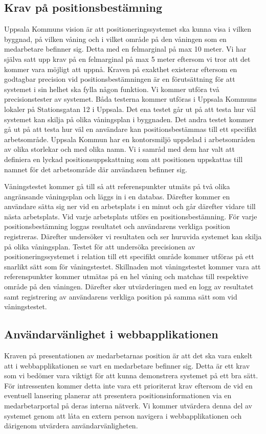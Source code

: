 \documentclass[a4paper,12pt]{article}
\begin{document}
 \subsection{Krav på positionsbestämning} \label{positionstest}
 Uppsala Kommuns vision är att positioneringssystemet ska kunna visa i vilken byggnad, på vilken våning och i vilket område på den våningen som en medarbetare befinner sig. Detta med en felmarginal på max 10 meter. Vi har själva satt upp krav på en felmarginal på max 5 meter eftersom vi tror att det kommer vara möjligt att uppnå. Kraven på exakthet existerar eftersom en godtagbar precision vid positionsbestämningen är en förutsättning för att systemet i sin helhet ska fylla någon funktion. Vi kommer utföra två precisionstester av systemet. Båda testerna kommer utföras i Uppsala Kommuns lokaler på Stationsgatan 12 i Uppsala. Det ena testet går ut på att testa hur väl systemet kan skilja på olika våningsplan i byggnaden. Det andra testet kommer gå ut på att testa hur väl en användare kan positionsbestämmas till ett specifikt arbetsområde. Uppsala Kommun har en kontorsmiljö uppdelad i arbetsområden av olika storlekar och med olika namn. Vi i samråd med dem har valt att definiera en lyckad positionsuppskattning som att positionen uppskattas till namnet för det arbetsområde där användaren befinner sig.

 Våningstestet kommer gå till så att referenspunkter utmäts på två olika angränsande våningsplan och läggs in i en databas. Därefter kommer en användare sätta sig ner vid en arbetsplats i en minut och går därefter vidare till nästa arbetsplats. Vid varje arbetsplats utförs en positionsbestämning. För varje positionsbestämning loggas resultatet och användarens verkliga position registreras. Därefter undersöker vi resultaten och ser huruvida systemet kan skilja på olika våningsplan.
 Testet för att undersöka precisionen av positioneringssystemet i relation till ett specifikt område kommer utföras på ett snarlikt sätt som för våningstestet. Skillnaden mot våningstestet kommer vara att referenspunkter kommer utmätas på en hel våning och matchas till respektive område på den våningen. Därefter sker utvärderingen med en logg av resultatet samt registrering av användarens verkliga position på samma sätt som vid våningstestet.



 \subsection{Användarvänlighet i webbapplikationen}\label{krav_anv}
 Kraven på presentationen av medarbetarnas position är att det ska vara enkelt att i webbapplikationen se vart en medarbetare befinner sig. Detta är ett krav som vi bedömer vara viktigt för att kunna demonstrera systemet på ett bra sätt. För intressenten kommer detta inte vara ett prioriterat krav eftersom de vid en eventuell lansering planerar att presentera positionsinformationen via en medarbetarportal på deras interna nätverk. Vi kommer utvärdera denna del av systemet genom att låta en extern person navigera i webbapplikationen och därigenom utvärdera användarvänligheten.
\end{document}
